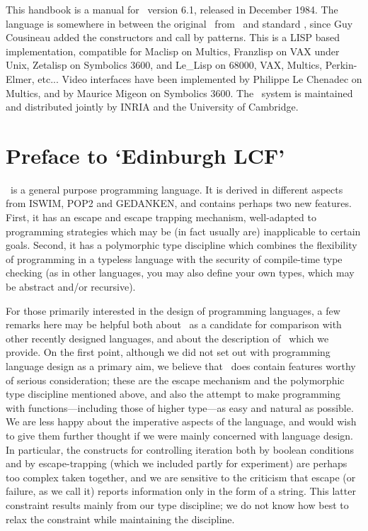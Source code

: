 This handbook is a manual for \ML~version 6.1, released in December 1984.
The language is somewhere in between the original \ML\ from \LCF\ and standard
\ML, since Guy Cousineau added the constructors and call by 
patterns.  This is a LISP based implementation, compatible for Maclisp on
Multics, Franzlisp on VAX under Unix, Zetalisp on Symbolics 3600, and Le\_Lisp
on 68000, VAX, Multics, Perkin-Elmer, etc... Video interfaces have been
implemented by Philippe Le Chenadec on Multics, and by Maurice Migeon
on Symbolics 3600.  The \ML\ system is maintained and distributed jointly by
{\small INRIA} and the University of Cambridge.


\section{Preface to `Edinburgh LCF'}

\ML\ is a general purpose programming language.
It is derived in different aspects from
{\small ISWIM}, {\small POP2} and {\small GEDANKEN}, and contains
perhaps two new features. First, it has an
escape and escape trapping mechanism, well-adapted  to programming
strategies which may be (in fact usually are)
inapplicable to certain goals. Second, it has a polymorphic type
discipline which combines the flexibility of programming in
a typeless language with the security of compile-time
type checking (as in other languages, you may also define
your own types, which may be abstract and/or recursive).

For those primarily interested in the design of programming
languages, a few remarks here may be helpful both about \ML\ as a
candidate for comparison with other recently designed languages,
and about the description of \ML\ which we
provide. On the first point, although we did not set out with
programming language design as a primary aim, we believe that \ML\ 
does contain features worthy of serious consideration; these are
the escape mechanism and the polymorphic type discipline mentioned
above, and also the attempt to make programming with functions---including 
those of higher type---as easy and natural as possible.
We are less happy about the imperative aspects of the language, and
would wish to give them further thought if we were mainly concerned
with language design. In particular, the constructs for controlling
iteration both by boolean conditions and by escape-trapping
(which we included partly for experiment) are perhaps too complex
taken together, and we are sensitive to the criticism that escape
(or failure, as we call it) reports information only in the form
of a string. This latter constraint results mainly
from our type discipline; we do not know how best to relax the
constraint while maintaining the discipline.

